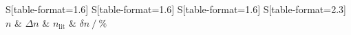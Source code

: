 \begin{table}
    \centering
    \caption{Messergebnisse.}
    \label{tab:4}
    \begin{tabular}{
	S[table-format=1.6]
	S[table-format=1.6]
	S[table-format=1.6]
	S[table-format=2.3]
	}
	\toprule
	{$n$}		& {$\Delta n$}		& 
	{$n_{\text{lit}}$}		& {$\delta n \:/\: \si{\percent}$}		\\ 
	\midrule
    
    \bottomrule
    \end{tabular}
    \end{table}

